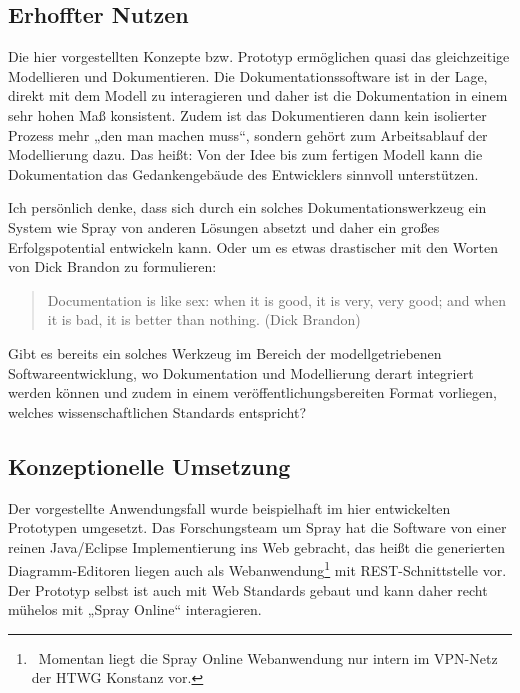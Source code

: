  
\subsection{Erhoffter Nutzen}\label{}
 
Die hier vorgestellten Konzepte bzw. Prototyp ermöglichen quasi das gleichzeitige Modellieren und Dokumentieren. Die Dokumentationssoftware ist in der Lage, direkt mit dem Modell zu interagieren und daher ist die Dokumentation in einem sehr hohen Maß konsistent. Zudem ist das Dokumentieren dann kein isolierter Prozess mehr „den man machen muss“, sondern gehört zum Arbeitsablauf der Modellierung dazu. Das heißt: Von der Idee bis zum fertigen Modell kann die Dokumentation das Gedankengebäude des Entwicklers sinnvoll unterstützen.

 
Ich persönlich denke, dass sich durch ein solches Dokumentationswerkzeug ein System wie Spray von anderen Lösungen absetzt und daher ein großes Erfolgspotential entwickeln kann. Oder um es etwas drastischer mit den Worten von Dick Brandon zu formulieren:

 
\begin{quote}
 Documentation is like sex: when it is good, it is very, very good; and when it is bad, it is better than nothing. (Dick Brandon)
\end{quote}
 
Gibt es bereits ein solches Werkzeug im Bereich der modellgetriebenen Softwareentwicklung, wo Dokumentation und Modellierung derart integriert werden können und zudem in einem veröffentlichungsbereiten Format vorliegen, welches wissenschaftlichen Standards entspricht?

 
\subsection{Konzeptionelle Umsetzung}\label{}
 
Der vorgestellte Anwendungsfall wurde beispielhaft im hier entwickelten Prototypen umgesetzt. Das Forschungsteam um Spray hat die Software von einer reinen Java/Eclipse Implementierung ins Web gebracht, das heißt die generierten Diagramm-Editoren liegen auch als Webanwendung\footnote{~Momentan liegt die Spray Online Webanwendung nur intern im VPN-Netz der HTWG Konstanz vor.} mit REST-Schnittstelle vor. Der Prototyp selbst ist auch mit Web Standards gebaut und kann daher recht mühelos mit „Spray Online“ interagieren.

